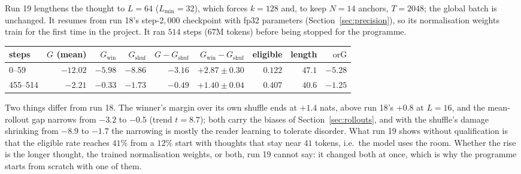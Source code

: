 \documentclass{article} %
\newcommand{\gain}{G}
\begin{document}
Run 19 lengthens the thought to $L{=}64$ ($L_{\min}{=}32$), which forces $k{=}128$ and, to keep $N{=}14$ anchors, $T{=}2048$; the global batch is unchanged. It resumes from run 18's step-$2{,}000$ checkpoint with fp32 parameters (Section~\ref{sec:precision}), so its normalisation weights train for the first time in the project. It ran $514$ steps ($67$M tokens) before being stopped for the programme.

\begin{center}\small
\begin{tabular}{lrrrrrrrr}
\toprule
steps & $\gain$ (mean) & $\gain_{\mathrm{win}}$ & $\gain_{\mathrm{shuf}}$ & $\gain - \gain_{\mathrm{shuf}}$ & $\gain_{\mathrm{win}} - \gain_{\mathrm{shuf}}$ & eligible & length & $\mathrm{orG}$ \\
\midrule
0--59    & $-12.02$ & $-5.98$ & $-8.86$ & $-3.16$ & $+2.87 \pm 0.30$ & $0.122$ & $47.1$ & $-5.28$ \\
455--514 & $-2.21$  & $-0.33$ & $-1.73$ & $-0.49$ & $+1.40 \pm 0.04$ & $0.407$ & $40.6$ & $-1.25$ \\
\bottomrule
\end{tabular}
\end{center}
Two things differ from run 18. The winner's margin over its own shuffle ends at $+1.4$ nats, above run 18's $+0.8$ at $L{=}16$, and the mean-rollout gap narrows from $-3.2$ to $-0.5$ (trend $t = 8.7$); both carry the biases of Section~\ref{sec:rollouts}, and with the shuffle's damage shrinking from $-8.9$ to $-1.7$ the narrowing is mostly the reader learning to tolerate disorder. What run 19 shows without qualification is that the eligible rate reaches $41\%$ from a $12\%$ start with thoughts that stay near $41$ tokens, i.e.\ the model uses the room. Whether the rise is the longer thought, the trained normalisation weights, or both, run 19 cannot say: it changed both at once, which is why the programme starts from scratch with one of them.
\end{document}
